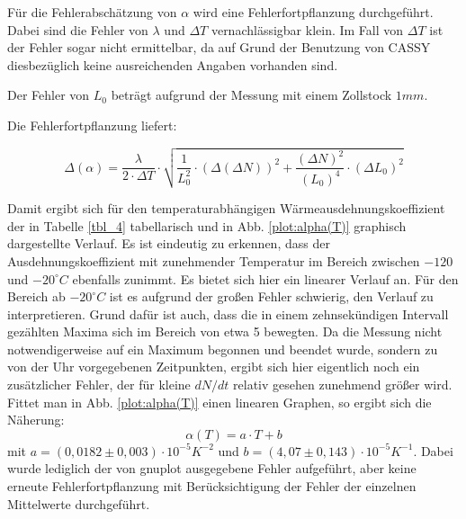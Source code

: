 Für die Fehlerabschätzung von $ \alpha $ wird eine Fehlerfortpflanzung durchgeführt.
Dabei sind die Fehler von $ \lambda $  und  $ \Delta T $ vernachlässigbar klein. Im Fall von $ \Delta T $ ist der Fehler sogar nicht ermittelbar, da auf Grund der Benutzung von CASSY diesbezüglich keine ausreichenden Angaben vorhanden sind.

Der Fehler von $ L_{0} $ beträgt aufgrund der Messung mit einem Zollstock $ 1 mm $.

Die Fehlerfortpflanzung liefert:

\begin{equation}
\Delta (\alpha) = \frac{\lambda}{2 \cdot \Delta T} \cdot \sqrt{\frac{1}{L_{0}^{2}} \cdot (\Delta(\Delta N))^{2} + \frac{(\Delta N)^{2}}{(L_{0})^{4}} \cdot (\Delta L_{0})^{2}}
\end{equation}


Damit ergibt sich für den temperaturabhängigen Wärmeausdehnungskoeffizient der in Tabelle \ref{tbl_4} tabellarisch und in Abb. \ref{plot:alpha(T)}
graphisch dargestellte Verlauf. Es ist eindeutig zu erkennen, dass der Ausdehnungskoeffizient mit zunehmender Temperatur 
im Bereich zwischen $ -120 $ und $ - 20 ^{\circ} C $ ebenfalls zunimmt. Es bietet sich hier ein linearer Verlauf an.
Für den Bereich ab $ -20 ^{\circ} C $ ist es aufgrund der großen Fehler schwierig, den Verlauf zu interpretieren. Grund 
dafür ist auch, dass die in einem zehnsekündigen Intervall gezählten Maxima sich im Bereich von etwa 5 bewegten. Da die
Messung nicht notwendigerweise auf ein Maximum begonnen und beendet wurde, sondern zu von der Uhr vorgegebenen Zeitpunkten,
ergibt sich hier eigentlich noch ein zusätzlicher Fehler, der für kleine $dN/dt$ relativ gesehen 
zunehmend größer wird. \\
Fittet man in Abb. \ref{plot:alpha(T)} einen linearen Graphen, so ergibt sich die Näherung:
\begin{equation}
\alpha(T) = a \cdot T + b 
\end{equation}
mit $ a = (0,0182 \pm 0,003) \cdot 10^{-5} K^{-2} $ und $ b = (4,07 \pm 0,143) \cdot 10^{-5} K^{-1} $. Dabei wurde lediglich
der von gnuplot ausgegebene Fehler aufgeführt, aber keine erneute Fehlerfortpflanzung mit Berücksichtigung der Fehler der einzelnen
Mittelwerte durchgeführt. 

